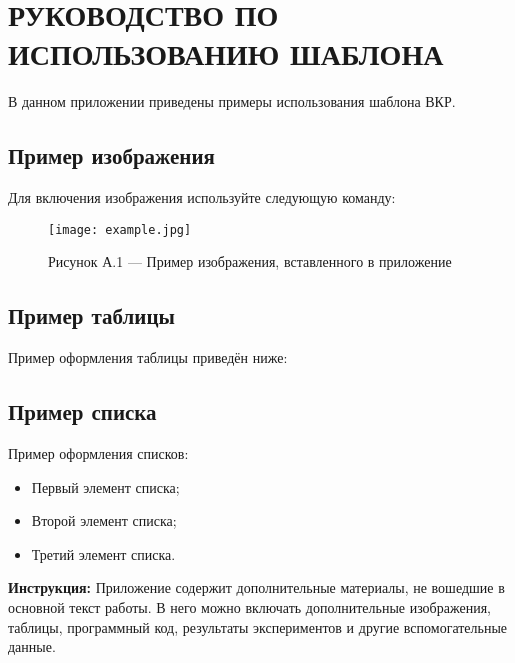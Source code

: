 \chapter{РУКОВОДСТВО ПО ИСПОЛЬЗОВАНИЮ ШАБЛОНА}

В данном приложении приведены примеры использования шаблона ВКР.

\section*{Пример изображения}
Для включения изображения используйте следующую команду:
\begin{figure}[h!]
\centering
\texttt{[image: example.jpg]}
\caption{Рисунок А.1 --- Пример изображения, вставленного в приложение}
\label{fig:test1}
\end{figure}

\section*{Пример таблицы}
Пример оформления таблицы приведён ниже:
\ExampleMultiLevelTable
\ExampleSplitTable

\section*{Пример списка}
Пример оформления списков:
\begin{itemize}
  \item Первый элемент списка;
  \item Второй элемент списка;
  \item Третий элемент списка.
\end{itemize}

\bigskip
\textbf{Инструкция:} Приложение содержит дополнительные материалы, не вошедшие в основной текст работы. В него можно включать дополнительные изображения, таблицы, программный код, результаты экспериментов и другие вспомогательные данные.
